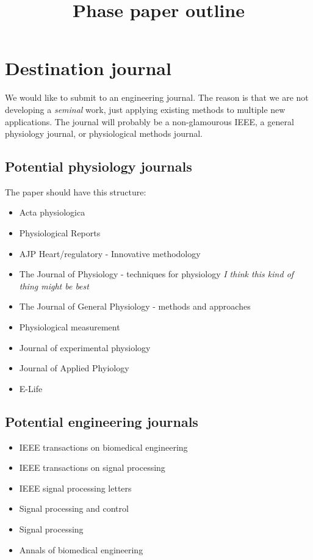 \documentclass{article}
\title{Phase paper outline}
\author{}
\date{}
\begin{document}
\maketitle

\section*{Destination journal}
We would like to submit to an engineering journal. The reason is that we are not developing a \textit{seminal} work, just applying existing methods to multiple new applications. The journal will probably be a non-glamourous IEEE, a general physiology journal, or physiological methods journal. 

\subsection*{Potential physiology journals}
The paper should have this structure:\cite{muller_estimation_2003}
\begin{itemize}
\item Acta physiologica
\item Physiological Reports
\item AJP Heart/regulatory - Innovative methodology
\item The Journal of Physiology - techniques for physiology \textit{I think this kind of thing might be best}
\item The Journal of General Physiology - methods and approaches
\item Physiological measurement
\item Journal of experimental physiology
\item Journal of Applied Phyiology
\item E-Life
\end{itemize}

\subsection*{Potential engineering journals}
\begin{itemize}
\item IEEE transactions on biomedical engineering
\item IEEE transactions on signal processing
\item IEEE signal processing letters
\item Signal processing and control
\item Signal processing
\item Annals of biomedical engineering
\end{itemize}
\end{document}
